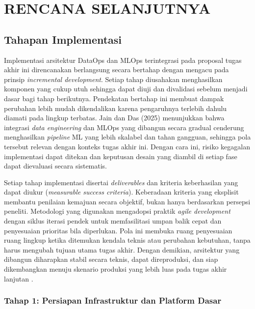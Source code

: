 \chapter{RENCANA SELANJUTNYA}
\label{chap:rencana_selanjutnya}

\section{Tahapan Implementasi}

Implementasi arsitektur DataOps dan MLOps terintegrasi pada proposal tugas akhir ini direncanakan berlangsung secara bertahap dengan mengacu pada prinsip \textit{incremental development}. Setiap tahap diusahakan menghasilkan komponen yang cukup utuh sehingga dapat diuji dan divalidasi sebelum menjadi dasar bagi tahap berikutnya. Pendekatan bertahap ini membuat dampak perubahan lebih mudah dikendalikan karena pengaruhnya terlebih dahulu diamati pada lingkup terbatas. Jain dan Das (2025) menunjukkan bahwa integrasi \textit{data engineering} dan MLOps yang dibangun secara gradual cenderung menghasilkan \textit{pipeline} ML yang lebih skalabel dan tahan gangguan, sehingga pola tersebut relevan dengan konteks tugas akhir ini. Dengan cara ini, risiko kegagalan implementasi dapat ditekan dan keputusan desain yang diambil di setiap fase dapat dievaluasi secara sistematis.

Setiap tahap implementasi disertai \textit{deliverables} dan kriteria keberhasilan yang dapat diukur (\textit{measurable success criteria}). Keberadaan kriteria yang eksplisit membantu penilaian kemajuan secara objektif, bukan hanya berdasarkan persepsi peneliti. Metodologi yang digunakan mengadopsi praktik \textit{agile development} dengan siklus iterasi pendek untuk memfasilitasi umpan balik cepat dan penyesuaian prioritas bila diperlukan. Pola ini membuka ruang penyesuaian ruang lingkup ketika ditemukan kendala teknis atau perubahan kebutuhan, tanpa harus mengubah tujuan utama tugas akhir. Dengan demikian, arsitektur yang dibangun diharapkan stabil secara teknis, dapat direproduksi, dan siap dikembangkan menuju skenario produksi yang lebih luas pada tugas akhir lanjutan \parencite{paleyes2022challenges}.

\subsection{Tahap 1: Persiapan Infrastruktur dan Platform Dasar}

